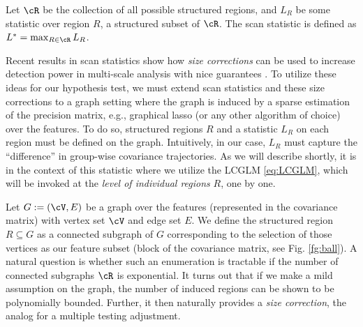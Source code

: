 \begin{definition} Let $\cR$ be the collection of all possible structured regions, and $L_R$ be some statistic over region $R$, a structured subset of $\cR$. The scan statistic is defined as $L^* = \max_{R\in\cR} L_R$.
\end{definition}
Recent results in scan statistics show how \textit{size corrections} can be used to increase detection power in multi-scale analysis with 
nice guarantees \cite{walther2010optimal,wang2016structured}. 
%
To utilize these ideas for our hypothesis test, we must extend scan statistics and these size corrections to a graph setting 
where the graph is induced by a sparse estimation of the precision matrix, e.g., graphical lasso (or any other algorithm of choice) over the features.
To do so, structured regions $R$ and a statistic $L_R$ on each region must be defined on the graph. Intuitively, in our case, 
$L_R$ must capture the ``difference'' in group-wise covariance trajectories. 
As we will describe shortly, it is in the context of this statistic where we utilize the LCGLM \eqref{eq:LCGLM}, which will be invoked at the {\em level of individual regions} $R$, one by one. 

Let $G:=(\cV,E)$ be a graph over the features (represented in the covariance matrix) with vertex set $\cV$ and edge set $E$. 
We define the structured region $R \subseteq G$ as a connected subgraph of $G$ corresponding to the 
selection of those vertices as our feature subset (block of the covariance matrix, see Fig. \ref{fg:ball}). 
A natural question is whether such an enumeration is tractable 
if the number of connected subgraphs $\cR$ is exponential. It turns out that if we make a mild assumption on the graph, 
the number of induced regions can be shown to be polynomially bounded. Further, it then naturally provides a {\em size correction}, the analog for a multiple testing adjustment. 


